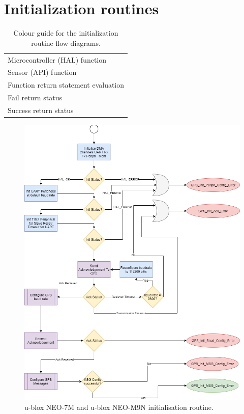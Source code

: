 \section{Initialization routines}

\begin{table}[H]
	\centering
	\caption{Colour guide for the initialization routine flow diagrams.}
	\begin{tabular}{l}
		\hline
		\cellcolor{micro}Microcontroller (HAL) function \\
		\cellcolor{sensor}Sensor (API) function \\
		\cellcolor{conditional}Function return statement evaluation \\
		\cellcolor{wrong}Fail return status \\
		\cellcolor{succ}Success return status\\
		\hline
	\end{tabular}
	
	\label{tab:Init_routine_Guide}
\end{table}


\begin{figure}[H]
	\centering
	\includegraphics[scale=0.3]{GPS Initialization Algorithm .png}
	\caption{u-blox NEO-7M and u-blox NEO-M9N initialisation routine.}
	\label{fig:Init_diagram_gps}
\end{figure}

